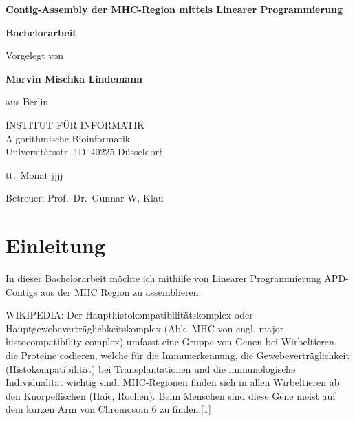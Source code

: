 \documentclass[12pt,ngerman,titlepage,a4paper]{article}
\begin{document}
\begin{titlepage}
\begin{center}

\textbf{\LARGE Contig-Assembly der MHC-Region mittels Linearer Programmierung}

\bigskip\bigskip
\textbf{Bachelorarbeit}

\bigskip\bigskip\bigskip
Vorgelegt von

\bigskip
\textbf{Marvin Mischka Lindemann}

\bigskip
aus Berlin


\vfill
INSTITUT FÜR INFORMATIK\\
Algorithmische Bioinformatik\\
Universitätsstr. 1D–40225 Düsseldorf

\bigskip
tt.\ Monat jjjj

\bigskip
Betreuer: Prof.\ Dr.\ Gunnar W. Klau

\end{center}
\end{titlepage}

\thispagestyle{empty}\mbox{}\pagebreak
\setcounter{page}{0}

\tableofcontents
\pagebreak

\section{Einleitung}
In dieser Bachelorarbeit möchte ich mithilfe von Linearer Programmierung APD-Contigs aus der MHC Region zu assemblieren.

WIKIPEDIA:
Der Haupthistokompatibilitätskomplex oder Hauptgewebeverträglichkeitskomplex (Abk. MHC von engl. major histocompatibility complex) umfasst eine Gruppe von Genen bei Wirbeltieren, die Proteine codieren, welche für die Immunerkennung, die Gewebeverträglichkeit (Histokompatibilität) bei Transplantationen und die immunologische Individualität wichtig sind. MHC-Regionen finden sich in allen Wirbeltieren ab den Knorpelfischen (Haie, Rochen). Beim Menschen sind diese Gene meist auf dem kurzen Arm von Chromosom 6 zu finden.[1]
\end{document}

